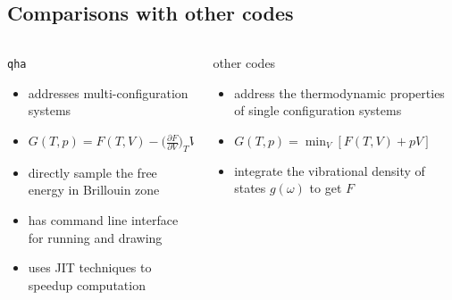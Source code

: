 \documentclass[13pt,aspectratio=169]{beamer}
\begin{document}
\subsection{Comparisons with other codes}
\begin{frame}{\subsecname}
	\begin{columns}
		\begin{column}{0.45\textwidth}
			\texttt{qha}\\
			\begin{itemize}[<+(1)->]
				\item addresses multi-configuration systems
				\item $G(T,p) = F(T, V) - \Big( \frac{ \partial F }{ \partial V } \Big)_T V$
				\item directly sample the free energy in Brillouin zone
				\item has command line interface for running and drawing
				\item uses JIT techniques to speedup computation
			\end{itemize}
		\end{column}

		\begin{column}{0.45\textwidth}
			other codes\\
			\begin{itemize}
				\item address the thermodynamic properties of single configuration systems
				\item $G(T,p)= \min_{V}[F(T,V)+pV]$ \cite{phonopy}
				\item integrate the vibrational density of states $g(\omega)$ to get $F$ \cite{Petretto:2018gg}
			\end{itemize}
		\end{column}
	\end{columns}
\end{frame}
\end{document}
